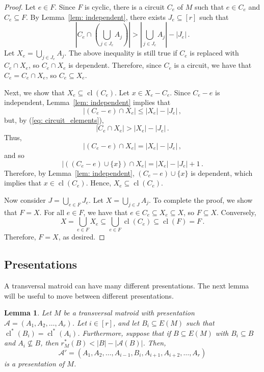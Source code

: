 \documentclass[11pt, reqno]{amsart}
\newtheorem{lemma}[theorem]{Lemma}
\DeclareMathOperator{\cl}{cl}
\begin{document}
\begin{proof}
Let $e \in F$. Since $F$ is cyclic, there is a circuit $C_e$ of $M$ such that $e \in C_e$ and $C_e \subseteq F$. By Lemma~\ref{lem: independent}, there exists $J_e \subseteq [r]$ such that 
\begin{equation}
\left|C_e \cap \left(\bigcup_{j \in J_e} A_j\right)\right| > \left|\bigcup_{j \in J_e} A_j \right| - |J_e| \,.
\label{eq: circuit_elements}
\end{equation}
Let $X_e = \bigcup_{j \in J_e} A_j$. The above inequality is still true if $C_e$ is replaced with $C_e \cap X_e$, so $C_e \cap X_e$ is dependent. Therefore, since $C_e$ is a circuit, we have that $C_e = C_e \cap X_e$, so $C_e \subseteq X_e$.

Next, we show that $X_e \subseteq \cl(C_e)$. Let $x \in X_e - C_e$. Since $C_e - e$ is independent, Lemma~\ref{lem: independent} implies that
$$
|(C_e - e) \cap X_e| \leq |X_e| - |J_e| \,,
$$
but, by (\ref{eq: circuit_elements}),
$$
|C_e \cap X_e| > |X_e| - |J_e| \,.
$$ 
Thus, 
$$
|(C_e - e) \cap X_e| = |X_e| - |J_e| \,,
$$
and so
$$
|((C_e - e) \cup \{x\}) \cap X_e| = |X_e| - |J_e| + 1 \,.
$$
Therefore, by Lemma~\ref{lem: independent}, $(C_e - e) \cup \{x\}$ is dependent, which implies that $x \in \cl(C_e)$. Hence, $X_e \subseteq \cl(C_e)$.

Now consider $J = \bigcup_{e \in F} J_e$. Let $X = \bigcup_{j \in J} A_j$. To complete the proof, we show that $F = X$. For all $e \in F$, we have that $e \in C_e \subseteq X_e \subseteq X$, so $F \subseteq X$. Conversely, 
$$
X = \bigcup_{e \in F} X_e \subseteq \bigcup_{e \in F} \cl(C_e) \subseteq \cl(F) = F \,.
$$ 
Therefore, $F = X$, as desired.
\end{proof}

\subsection{Presentations}
A transversal matroid can have many different presentations. The next lemma will be useful to move between different presentations.

\begin{lemma} \label{lem: move between presentation}
Let $M$ be a transversal matroid with presentation $\mathcal A = (A_1, A_2, \ldots, A_r)$. Let $i \in [r]$, and let $B_i \subseteq E(M)$ such that $\cl^*(B_i) = \cl^*(A_i)$. Furthermore, suppose that if $B \subseteq E(M)$ with $B_i \subseteq B$ and $A_i \not\subseteq B$, then $r^*_M(B) < |B| - |\mathcal A(B)|$. Then,
$$
\mathcal A' = (A_1, A_2, \ldots, A_{i-1}, B_i, A_{i+1}, A_{i+2}, \ldots, A_r)
$$
is a presentation of $M$.
\end{lemma}
\end{document}
